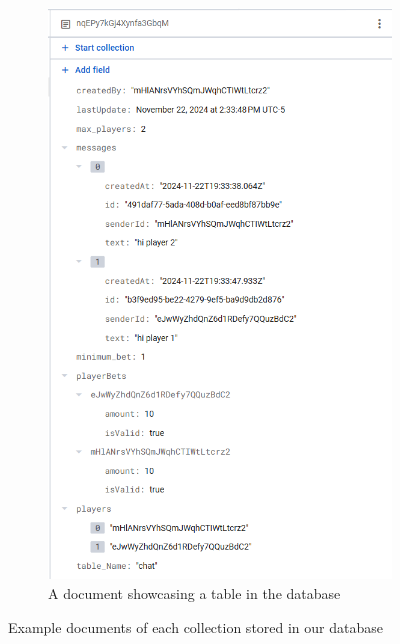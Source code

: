 \begin{figure}[b]
\begin{subfigure}[b]{0.45\textwidth}
        \includegraphics[width=\textwidth]{figures/DB Screenshot table.png}
        \caption{A document showcasing a table in the database}
        \label{fig:tableDB}
    \end{subfigure}

    \caption{Example documents of each collection stored in our database}
    \label{fig:mainfigure}
\end{figure}

\pagebreak
